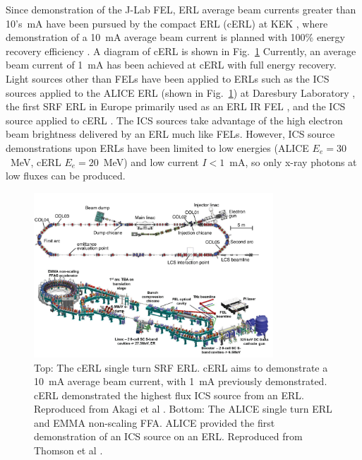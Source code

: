 \documentclass[../main.tex]{subfiles}
\begin{document}
Since demonstration of the J-Lab FEL, ERL average beam currents greater than 10's~\si{\milli\ampere} have been pursued by the compact ERL (cERL) at KEK \cite{akagi2016narrow}, where demonstration of a 10~\si{\milli\ampere} average beam current is planned with 100\% energy recovery efficiency \cite{adolphsen2022european}. A diagram of cERL is shown in Fig.~\ref{fig:cERL_ALICE_diagram} Currently, an average beam current of 1~\si{\milli\ampere} has been achieved at cERL \cite{obina20191} with full energy recovery. Light sources other than FELs have been applied to ERLs such as the ICS sources applied to the ALICE ERL (shown in Fig.~\ref{fig:cERL_ALICE_diagram}) at Daresbury Laboratory \cite{priebe2008inverse,priebe2010first}, the first SRF ERL in Europe primarily used as an ERL IR FEL \cite{thompson2014status}, and the ICS source applied to cERL \cite{akagi2016narrow}. The ICS sources take advantage of the high electron beam brightness delivered by an ERL much like FELs. However, ICS source demonstrations upon ERLs have been limited to low energies (ALICE $E_{e}=30$~\si{\mega\electronvolt}, cERL  $E_{e}=20$~\si{\mega\electronvolt}) and low current $I < 1$~\si{\milli\ampere}, so only x-ray photons at low fluxes can be produced. 
\begin{figure}[!h]
\centering
\includegraphics[width=0.8\textwidth]{Figures/Introduction/cERL_ALICE.pdf}
\caption{Top: The cERL single turn SRF ERL. cERL aims to demonstrate a 10~\si{\milli\ampere} average beam current, with 1~\si{\milli\ampere} previously demonstrated. cERL demonstrated the highest flux ICS source from an ERL. Reproduced from Akagi et al \cite{akagi2016narrow}. Bottom: The ALICE single turn ERL and EMMA non-scaling FFA. ALICE provided the first demonstration of an ICS source on an ERL. Reproduced from Thomson et al \cite{thompson2014status}.}
\label{fig:cERL_ALICE_diagram}
\end{figure}
\end{document}
